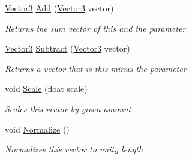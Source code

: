 \begin{DoxyCompactItemize}
\item 
\hyperlink{struct_engine_1_1_vector3}{Vector3} \hyperlink{struct_engine_1_1_vector3_a4e6601bfc10395a8d860e5fe548bb929}{Add} (\hyperlink{struct_engine_1_1_vector3}{Vector3} vector)
\begin{DoxyCompactList}\small\item\em Returns the sum vector of this and the parameter \end{DoxyCompactList}\item 
\hyperlink{struct_engine_1_1_vector3}{Vector3} \hyperlink{struct_engine_1_1_vector3_af6fcd3edd00fc21eedb430adb41ad542}{Subtract} (\hyperlink{struct_engine_1_1_vector3}{Vector3} vector)
\begin{DoxyCompactList}\small\item\em Returns a vector that is this minus the parameter \end{DoxyCompactList}\item 
void \hyperlink{struct_engine_1_1_vector3_a6f036d805c82c68f76fd8f2ebb3984a3}{Scale} (float scale)
\begin{DoxyCompactList}\small\item\em Scales this vector by given amount \end{DoxyCompactList}\item 
void \hyperlink{struct_engine_1_1_vector3_a98b8751a79adb84cb0ce01b1fd718b43}{Normalize} ()
\begin{DoxyCompactList}\small\item\em Normalizes this vector to unity length \end{DoxyCompactList}\end{DoxyCompactItemize}
